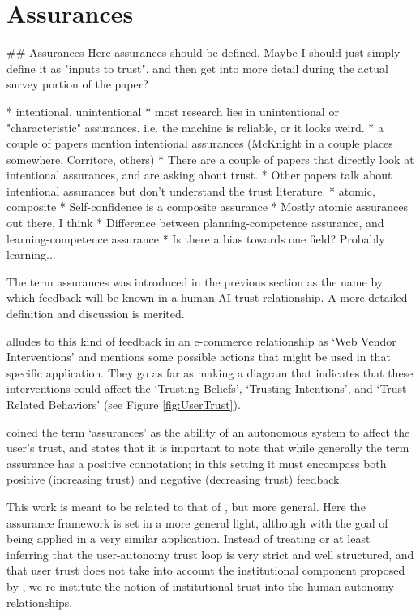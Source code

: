 \section{Assurances}
    ## Assurances
Here assurances should be defined. Maybe I should just simply define it as "inputs to trust", and then get into more detail during the actual survey portion of the paper?

* intentional, unintentional
    * most research lies in unintentional or "characteristic" assurances. i.e. the machine is reliable, or it looks weird.
    * a couple of papers mention intentional assurances (McKnight in a couple places somewhere, Corritore, others)
    * There are a couple of papers that directly look at intentional assurances, and are asking about trust.
    * Other papers talk about intentional assurances but don't understand the trust literature.
* atomic, composite
    * Self-confidence is a composite assurance
    * Mostly atomic assurances out there, I think
* Difference between planning-competence assurance, and learning-competence assurance
    * Is there a bias towards one field? Probably learning...

    The term assurances was introduced in the previous section as the name by which feedback will be known in a human-AI trust relationship. A more detailed definition and discussion is merited.

    \citet{McKnight2001-fa} alludes to this kind of feedback in an e-commerce relationship as `Web Vendor Interventions' and mentions some possible actions that might be used in that specific application. They go as far as making a diagram that indicates that these interventions could affect the `Trusting Beliefs', `Trusting Intentions', and `Trust-Related Behaviors' (see Figure \ref{fig:UserTrust}).
    
    \citet{Lillard2016-yg} coined the term `assurances' as the ability of an autonomous system to affect the user's trust, and states that it is important to note that while generally the term assurance has a positive connotation; in this setting it must encompass both positive (increasing trust) and negative (decreasing trust) feedback.

    This work is meant to be related to that of \citet{Lillard2016-yg}, but more general. Here the assurance framework is set in a more general light, although with the goal of being applied in a very similar application. Instead of treating or at least inferring that the user-autonomy trust loop is very strict and well structured, and that user trust does not take into account the institutional component proposed by \citet{McKnight2001-fa}, we re-institute the notion of institutional trust into the human-autonomy relationships.

